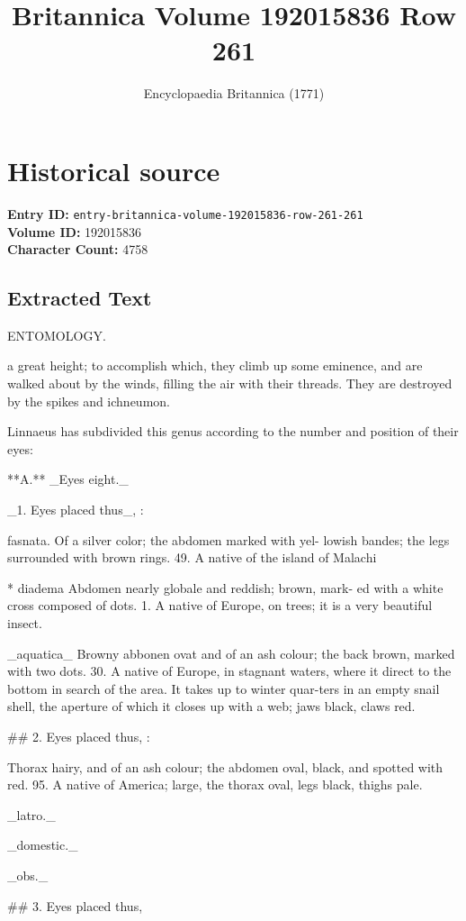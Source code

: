 \documentclass{article}
\title{Britannica Volume 192015836 Row 261}
\date{Encyclopaedia Britannica (1771)}
\begin{document}
\maketitle

\section*{Historical source}
\textbf{Entry ID:} \texttt{entry-britannica-volume-192015836-row-261-261} \\
\textbf{Volume ID:} 192015836 \\
\textbf{Character Count:} 4758

\subsection*{Extracted Text}
ENTOMOLOGY.

a great height; to accomplish which, they climb up some eminence, and are walked about by the winds, filling the air with their threads. They are destroyed by the spikes and ichneumon.

Linnaeus has subdivided this genus according to the number and position of their eyes:

**A.** \_Eyes eight.\_

\_1. Eyes placed thus\_, :

fasnata. Of a silver color; the abdomen marked with yel- lowish bandes; the legs surrounded with brown rings. 49. A native of the island of Malachi

* diadema Abdomen nearly globale and reddish; brown, mark- ed with a white cross composed of dots. 1. A native of Europe, on trees; it is a very beautiful insect.

\_aquatica\_ Browny abbonen ovat and of an ash colour; the back brown, marked with two dots. 30. A native of Europe, in stagnant waters, where it direct to the bottom in search of the area. It takes up to winter quar-ters in an empty snail shell, the aperture of which it closes up with a web; jaws black, claws red.

\#\# 2. Eyes placed thus, :

Thorax hairy, and of an ash colour; the abdomen oval, black, and spotted with red. 95. A native of America; large, the thorax oval, legs black, thighs pale.

\_latro.\_

\_domestic.\_

\_obs.\_

\#\# 3. Eyes placed thus,
\end{document}
